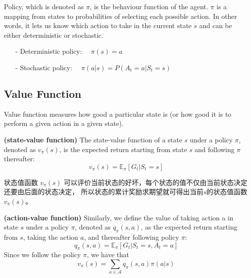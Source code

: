 Policy, which is denoted as $\pi$, is the behaviour function of the agent. $\pi$ 
is a mapping from states to probabilities of selecting each possible action. In 
other words, it lets us know which action to take in the current state $s$ and can 
be either deterministic or stochastic.

\begin{itemize}
\setlength{\parskip}{0pt}
\item[-]
Deterministic policy:
$\quad\pi(s)=a$

\item[-]
Stochastic policy: 
$\quad\pi(a|s)=P(A_t=a|S_t=s)$

\end{itemize}


\subsection{Value Function}

Value function measures how good a particular state is (or how good it is to 
perform a given action in a given state).

\begin{definition} {\rm\bf (state-value function)}
The state-value function of a state $s$ under a policy $\pi$, denoted as $v_\pi(s)$, 
is the expected return starting from state $s$ and following $\pi$ thereafter:
\begin{equation}
v_\pi(s)=\mathbb{E}_\pi[G_t|S_t=s]
\end{equation}
\end{definition}

状态值函数 $v_\pi(s)$ 可以评价当前状态的好坏，每个状态的值不仅由当前状态决定还要由后面的状态决定，
所以状态的累计奖励求期望就可得出当前$s$的状态值函数 $v_\pi(s)$。

\begin{definition} {\rm\bf (action-value function)}
Similarly, we define the value of taking action a in state $s$ under a policy $\pi$, 
denoted as $q_\pi(s,a)$, as the expected return starting from $s$, taking the 
action $a$, and thereafter following policy $\pi$:
\begin{equation}
q_\pi(s,a)=\mathbb{E}_\pi[G_t|S_t=s,A_t=a]
\end{equation}
Since we follow the policy $\pi$, we have that
\begin{equation}
v_\pi(s)=\sum_{a\in\mathcal{A}}q_\pi(s,a)\pi(a|s)
\end{equation}
\end{definition}



